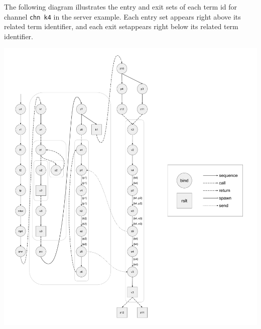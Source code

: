 \documentclass[letterpaper, 11pt]{report}
\begin{document}
The following diagram illustrates the entry and exit sets of each term id
for channel \lstinline{chn k4} in
the server example. Each entry set appears right above its related term identifier,
and each exit setappears right below its related term identifier. 

\includegraphics[width=1\textwidth]{cml-liveness-analysis-k4.pdf}
\end{document}
